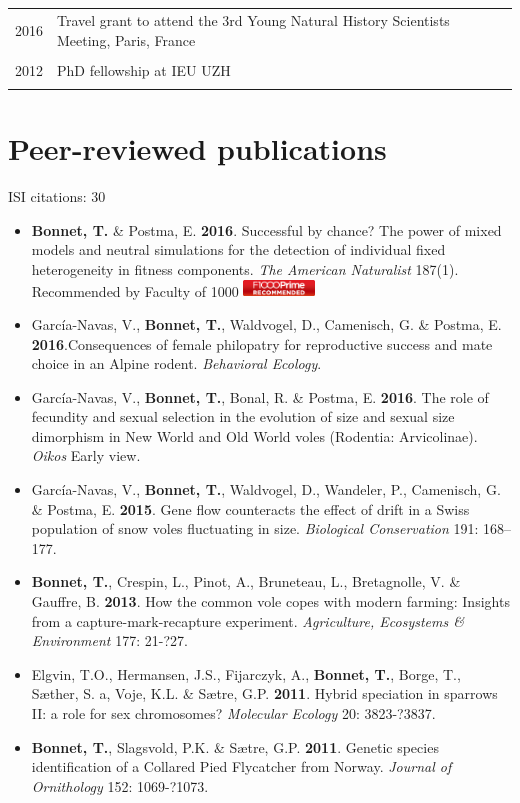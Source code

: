 \subsection{}
\begin{tabular}{p{4cm}|p{11cm}}
\hfill \textsc{2016} & Travel grant to attend the 3rd Young Natural History Scientists Meeting, Paris, France\\
\multicolumn{2}{c}{} \\
\hfill \textsc{2012} & PhD fellowship at IEU UZH\\
\multicolumn{2}{c}{} \\
\end{tabular}

\section{Peer-reviewed publications}
ISI citations: 30
\vspace{10pt}
\begin{itemize}
\item \textbf{Bonnet, T.} \& Postma, E. \textbf{2016}. Successful by chance? The power of mixed models and neutral simulations for the detection of individual fixed heterogeneity in fitness components. \textit{The American Naturalist} 187(1). {\footnotesize Recommended by Faculty of 1000}
\includegraphics[width=0.15\textwidth]{FiguresGeneral/F1000badge}
\item Garc\'{i}a-Navas, V., \textbf{Bonnet, T.}, Waldvogel, D., Camenisch, G. \& Postma, E. \textbf{2016}.Consequences of female philopatry for reproductive success and mate choice in an Alpine rodent. \textit{Behavioral Ecology}.
\item Garc\'{i}a-Navas, V., \textbf{Bonnet, T.}, Bonal, R. \& Postma, E. \textbf{2016}. The role of fecundity and sexual selection in the evolution of size and sexual size dimorphism in New World and Old World voles (Rodentia: Arvicolinae). \textit{Oikos} Early view.
\item Garc\'{i}a-Navas, V., \textbf{Bonnet, T.}, Waldvogel, D., Wandeler, P., Camenisch, G. \& Postma, E. \textbf{2015}. Gene flow counteracts the effect of drift in a Swiss population of snow voles fluctuating in size. \textit{Biological Conservation} 191: 168--177.
\item \textbf{Bonnet, T.}, Crespin, L., Pinot, A., Bruneteau, L., Bretagnolle, V. \& Gauffre, B. \textbf{2013}. How the common vole copes with modern farming: Insights from a capture-mark-recapture experiment. \textit{Agriculture, Ecosystems \& Environment} 177: 21-?27.
\item Elgvin, T.O., Hermansen, J.S., Fijarczyk, A., \textbf{Bonnet, T.}, Borge, T., S{\ae}ther, S. a, Voje, K.L. \& S{\ae}tre, G.P. \textbf{2011}. Hybrid speciation in sparrows II: a role for sex chromosomes? \textit{Molecular Ecology} 20: 3823-?3837.
\item \textbf{Bonnet, T.}, Slagsvold, P.K. \& S{\ae}tre, G.P. \textbf{2011}. Genetic species identification of a Collared Pied Flycatcher from Norway. \textit{Journal of Ornithology} 152: 1069-?1073.
\end{itemize}

